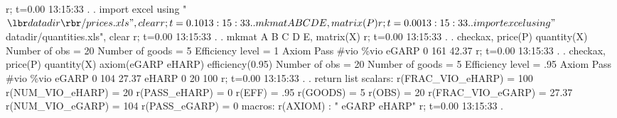 r; t=0.00 13:15:33
{\smallskip}
. 
. import excel using "${\lbr}datadir{\rbr}/prices.xls", clear
r; t=0.10 13:15:33
{\smallskip}
. 
. mkmat A B C D E, matrix(P)
r; t=0.00 13:15:33
{\smallskip}
. 
. import excel using "${\lbr}datadir{\rbr}/quantities.xls", clear
r; t=0.00 13:15:33
{\smallskip}
. 
. mkmat A B C D E, matrix(X)
r; t=0.00 13:15:33
{\smallskip}
. 
. checkax, price(P) quantity(X)
{\smallskip}
              Number of obs           =      20 
              Number of goods         =       5 
              Efficiency level        =       1 
{\smallskip}
       Axiom {\VBAR}      Pass       \#vio       \%vio 
       eGARP {\VBAR}         0        161      42.37 
r; t=0.00 13:15:33
{\smallskip}
. 
. checkax, price(P) quantity(X) axiom(eGARP eHARP) efficiency(0.95)
{\smallskip}
              Number of obs           =      20 
              Number of goods         =       5 
              Efficiency level        =     .95 
{\smallskip}
       Axiom {\VBAR}      Pass       \#vio       \%vio 
       eGARP {\VBAR}         0        104      27.37 
       eHARP {\VBAR}         0         20        100 
r; t=0.00 13:15:33
{\smallskip}
. 
. return list
{\smallskip}
scalars:
     r(FRAC_VIO_eHARP) =  100
      r(NUM_VIO_eHARP) =  20
         r(PASS_eHARP) =  0
                r(EFF) =  .95
              r(GOODS) =  5
                r(OBS) =  20
     r(FRAC_VIO_eGARP) =  27.37
      r(NUM_VIO_eGARP) =  104
         r(PASS_eGARP) =  0
{\smallskip}
macros:
              r(AXIOM) : " eGARP eHARP"
r; t=0.00 13:15:33
{\smallskip}
. 
